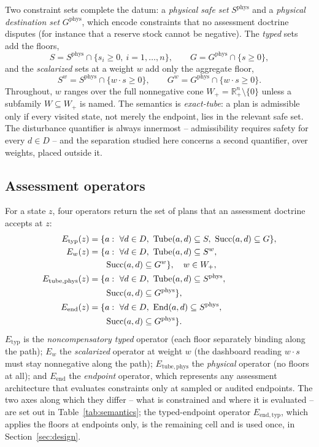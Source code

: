 \documentclass[preprint,11pt,authoryear]{elsarticle}
\theoremstyle{definition}
\theoremstyle{remark}
\newcommand{\Etyp}{E_{\mathrm{typ}}}
\newcommand{\Eend}{E_{\mathrm{end}}}
\newcommand{\Ephys}{E_{\mathrm{tube,phys}}}
\newcommand{\Wp}{W_+}
\newcommand{\Tube}{\mathrm{Tube}}
\newcommand{\Succ}{\mathrm{Succ}}
\newcommand{\End}{\mathrm{End}}
\newcommand{\Rp}{\mathbb{R}^n_+}
\begin{document}
Two constraint sets complete the datum: a \emph{physical safe set} $S^{\mathrm{phys}}$ and a \emph{physical destination set} $G^{\mathrm{phys}}$, which encode constraints that no assessment doctrine disputes (for instance that a reserve stock cannot be negative). The \emph{typed} sets add the floors,
\[
S=S^{\mathrm{phys}}\cap\{s_i\ge0,\ i=1,\dots,n\},\qquad G=G^{\mathrm{phys}}\cap\{s\ge0\},
\]
and the \emph{scalarized} sets at a weight $w$ add only the aggregate floor,
\[
S^w=S^{\mathrm{phys}}\cap\{w\cdot s\ge0\},\qquad G^w=G^{\mathrm{phys}}\cap\{w\cdot s\ge0\}.
\]
Throughout, $w$ ranges over the full nonnegative cone $\Wp=\Rp\setminus\{0\}$ unless a subfamily $W\subseteq\Wp$ is named. The semantics is \emph{exact-tube}: a plan is admissible only if every visited state, not merely the endpoint, lies in the relevant safe set. The disturbance quantifier is always innermost -- admissibility requires safety for every $d\in D$ -- and the separation studied here concerns a second quantifier, over weights, placed outside it.

\subsection{Assessment operators}

For a state $z$, four operators return the set of plans that an assessment doctrine accepts at $z$:
\begin{align}
\Etyp(z)&=\{a:\ \forall d\in D,\ \Tube(a,d)\subseteq S,\ \Succ(a,d)\subseteq G\}, \label{eq:Etyp}\\
E_w(z)&=\{a:\ \forall d\in D,\ \Tube(a,d)\subseteq S^w,\notag\\
&\qquad\Succ(a,d)\subseteq G^w\},\quad w\in\Wp, \label{eq:Ew}\\
\Ephys(z)&=\{a:\ \forall d\in D,\ \Tube(a,d)\subseteq S^{\mathrm{phys}},\notag\\
&\qquad\Succ(a,d)\subseteq G^{\mathrm{phys}}\}, \label{eq:Ephys}\\
\Eend(z)&=\{a:\ \forall d\in D,\ \End(a,d)\subseteq S^{\mathrm{phys}},\notag\\
&\qquad\Succ(a,d)\subseteq G^{\mathrm{phys}}\}. \label{eq:Eend}
\end{align}
$\Etyp$ is the \emph{noncompensatory typed} operator (each floor separately binding along the path); $E_w$ the \emph{scalarized} operator at weight $w$ (the dashboard reading $w\cdot s$ must stay nonnegative along the path); $\Ephys$ the \emph{physical} operator (no floors at all); and $\Eend$ the \emph{endpoint} operator, which represents any assessment architecture that evaluates constraints only at sampled or audited endpoints. The two axes along which they differ -- what is constrained and where it is evaluated -- are set out in Table~\ref{tab:semantics}; the typed-endpoint operator $E_{\mathrm{end,typ}}$, which applies the floors at endpoints only, is the remaining cell and is used once, in Section~\ref{sec:design}.
\end{document}
